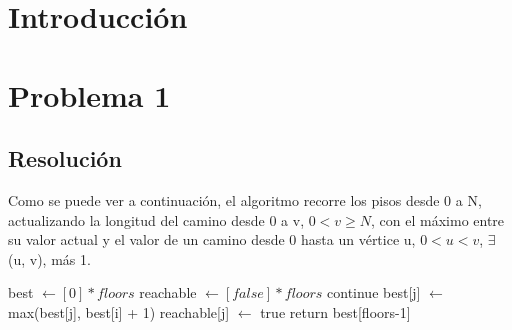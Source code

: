 \documentclass{article}
\theoremstyle{definition}
\theoremstyle{remark}
\begin{document}
{} %

\subtitulo{}
\grupo{}

 
\maketitle

\pagebreak

\tableofcontents

\pagebreak

\section{Introducción}

\section{Problema 1}

\subsection{Resolución}

Como se puede ver a continuación, el algoritmo recorre los pisos desde 0 a N, actualizando la longitud del camino desde 0 a v, $0 < v \geq N$, con el máximo entre su valor actual y el valor de un camino desde 0 hasta un vértice u, $0 < u < v$, $\exists$ (u, v), más 1.\\


\begin{algorithmic}
\State best $\gets [0] * floors$
\State reachable $\gets [false] * floors$
 
        \State continue
    \EndIf
     
            \State best[j] $\gets$ max(best[j], best[i] + 1)
            \State reachable[j] $\gets$ true
        \EndIf    
    \EndFor
\EndFor
\State return best[floors-1]
\EndProcedure\\
\end{algorithmic}
\end{document}

